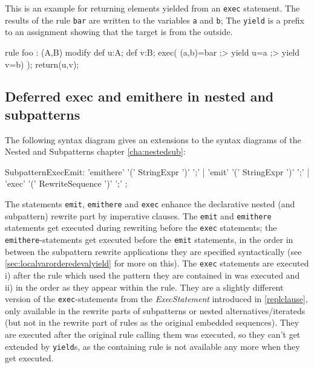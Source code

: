 \begin{example}
This is an example for returning elements yielded from an \texttt{exec} statement.
The results of the rule \texttt{bar} are written to the variables \texttt{a} and \texttt{b};
The \texttt{yield} is a prefix to an assignment showing that the target is from the outside.

	\begin{grgen}
rule foo : (A,B)
{
  modify {
    def u:A; def v:B;
    exec( (a,b)=bar ;> yield u=a ;> yield v=b) );
    return(u,v);
  }
}
	\end{grgen}
\end{example}

\subsection{Deferred exec and emithere in nested and subpatterns}\label{sec:deferredexecemithere}

The following syntax diagram gives an extensions to the syntax diagrams of the Nested and Subpatterns chapter \ref{cha:nestedsub}:
\begin{rail}
  SubpatternExecEmit:
		'emithere' '(' StringExpr ')' ';' |
		'emit' '(' StringExpr ')' ';' |
		'exec' '(' RewriteSequence ')' ';'
	;
\end{rail}

The statements \texttt{emit}, \texttt{emithere} and \texttt{exec} enhance the declarative nested (and subpattern) rewrite part by imperative clauses.
The \texttt{emit} and \texttt{emithere} statements get executed during rewriting before the \texttt{exec} statements;
the \texttt{emithere}-statements get executed before the \texttt{emit} statements,
in the order in between the subpattern rewrite applications they are specified syntactically
(see \ref{sec:localvarorderedevalyield} for more on this).
The \texttt{exec} statements are executed i) after the rule which used the pattern they are contained in was executed and ii) in the order as they appear within the rule.
They are a slightly different version of the \texttt{exec}-statements from the \emph{ExecStatement} introduced in \ref{replclause}, only available in the rewrite parts of subpatterns or nested alternatives/iterateds
(but not in the rewrite part of rules as the original embedded sequences).
They are executed after the original rule calling them was executed,
so they can't get extended by \texttt{yield}s,
as the containing rule is not available any more when they get executed.

